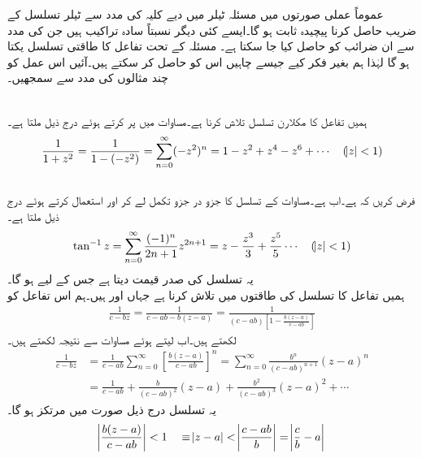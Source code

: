 عموماً عملی صورتوں میں مسئلہ ٹیلر میں دیے کلیہ کی مدد سے  ٹیلر تسلسل کے  ضریب   حاصل کرنا پیچیدہ ثابت ہو گا۔ایسے کئی دیگر نسبتاً سادہ  تراکیب ہیں جن کی مدد سے ان ضرائب کو حاصل کیا جا سکتا ہے۔ مسئلہ  کے تحت تفاعل کا طاقتی تسلسل یکتا ہو گا لہٰذا ہم بغیر فکر کیے جیسے چاہیں اس کو حاصل کر سکتے ہیں۔آئیں اس عمل کو چند مثالوں کی مدد سے سمجھیں۔

\quad {}\\
ہمیں تفاعل  کا مکلارن تسلسل تلاش کرنا ہے۔مساوات  میں  پر کرتے ہوئے  درج ذیل ملتا ہے۔
\begin{align}\label{مساوات_ٹیلر_عملی_تراکیب_الف}
\frac{1}{1+z^2}=\frac{1}{1-(-z^2)}=\sum\limits_{n=0}^{\infty} (-z^2)^n =1-z^2+z^4-z^6+\cdots \quad (\abs{z}<1)
\end{align}
  \quad {}\\
فرض کریں کہ  ہے۔اب  ہے۔مساوات  کے تسلسل کا جزو در جزو تکمل لے کر اور  استعمال کرتے ہوئے درج ذیل ملتا ہے۔
\begin{align*}
\tan^{-1}z=\sum\limits_{n=0}^{\infty} \frac{(-1)^n}{2n+1}z^{2n+1}=z-\frac{z^3}{3}+\frac{z^5}{5}\cdots\quad (\abs{z}<1)
\end{align*}
یہ تسلسل   کی صدر قیمت دیتا ہے جس کے لیے  ہو گا۔
\quad {}\\
ہمیں تفاعل  کا تسلسل  کی طاقتوں میں تلاش کرنا ہے جہاں  اور  ہیں۔ہم اس تفاعل کو 
\begin{align*}
\frac{1}{c-bz}=\frac{1}{c-ab-b(z-a)}=\frac{1}{(c-ab)[1-\tfrac{b(z-a)}{c-ab}]}
\end{align*}
لکھتے ہیں۔اب  لیتے ہوئے مساوات  سے نتیجہ لکھتے ہیں۔
\begin{align*}
\frac{1}{c-bz}&=\frac{1}{c-ab}\sum\limits_{n=0}^{\infty}[\frac{b(z-a)}{c-ab}]^n=\sum\limits_{n=0}^{\infty} \frac{b^n}{(c-ab)^{n+1}}(z-a)^n\\
&=\frac{1}{c-ab}+\frac{b}{(c-ab)^2}(z-a)+\frac{b^2}{(c-ab)^3}(z-a)^2+\cdots
\end{align*}
یہ تسلسل درج ذیل صورت میں مرتکز ہو گا۔
\begin{align*}
\abs{\frac{b(z-a)}{c-ab}}<1 \quad \equiv \abs{z-a}<\abs{\frac{c-ab}{b}}=\abs{\frac{c}{b}-a}
\end{align*}
